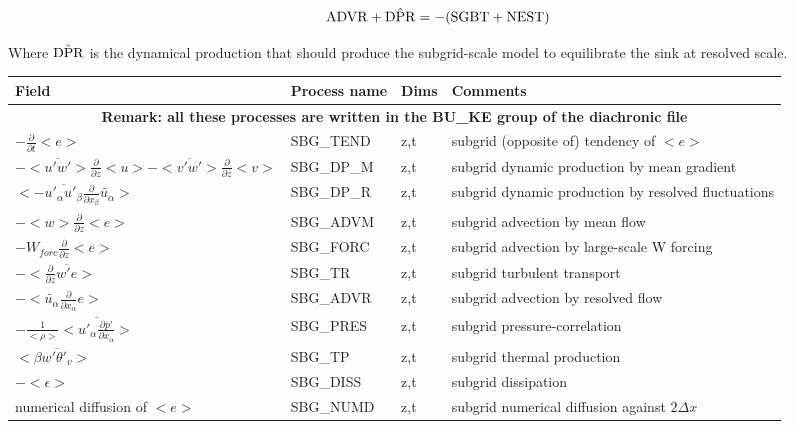 \begin{displaymath}
{\rm ADVR}+\hat{\rm DPR} = -({\rm SGBT+NEST})
\end{displaymath}

Where $\hat{\rm DPR}$ is the dynamical production that should produce
the subgrid-scale model to equilibrate the sink at resolved scale.



\begingroup
\renewcommand\arraystretch{1.5}
\begin{longtable}[c]{|p{}|p{}|p{}|p{}|}
\hline
Field & Process name & Dims & Comments \\
\hline \hline
\endhead
\multicolumn{4}{|c|}{\textbf{Remark: all these processes are written in the BU\_KE group of the diachronic file}} \\
\hline
\endfoot
$-\frac{\partial }{\partial t}<e>$             & SBG\_TEND & z,t & subgrid (opposite of) tendency of $<e>$ \\\hline
$-<\overline{u'w'}>\frac{\partial }{\partial z}<u>-<\overline{v'w'}>\frac{\partial }{\partial z}<v>$ & SBG\_DP\_M & z,t & subgrid dynamic production by mean gradient \\\hline
$<-\overline{u'_\alpha u'_\beta}\frac{\partial}{\partial x_\beta}\tilde{u_\alpha}>$ & SBG\_DP\_R & z,t & subgrid dynamic production by resolved fluctuations \\\hline
$-<w>\frac{\partial}{\partial z}<e>$           & SBG\_ADVM & z,t & subgrid advection by mean flow\\\hline
$-W_{forc}\frac{\partial}{\partial z}<e>$      & SBG\_FORC & z,t & subgrid advection by large-scale W forcing\\\hline
$-<\frac{\partial}{\partial z}\overline{w'e}>$ & SBG\_TR   & z,t & subgrid turbulent transport\\\hline
$-<\tilde{u_\alpha}\frac{\partial}{\partial x_\alpha}e>$ & SBG\_ADVR & z,t & subgrid advection by resolved flow\\\hline
$- \frac{1}{<\rho>}<\overline{u'_\alpha \frac{\partial p'}{\partial x_\alpha}}>$& SBG\_PRES & z,t & subgrid pressure-correlation \\\hline
$<\beta  \overline{w'\theta'_v}>$              & SBG\_TP   & z,t & subgrid thermal production \\\hline
$-<\epsilon>$                                  & SBG\_DISS & z,t & subgrid dissipation \\\hline
{\rm numerical diffusion of } $<e>$            & SBG\_NUMD & z,t & subgrid numerical diffusion against $2\Delta x$ \\\hline

\end{longtable}
